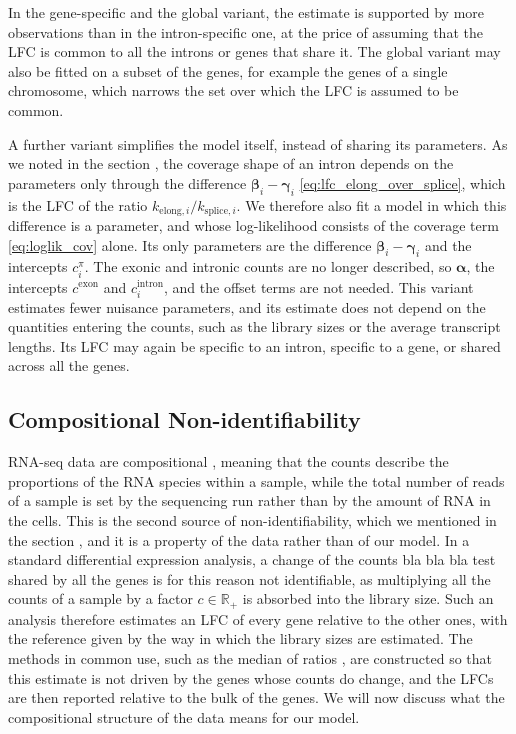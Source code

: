 \documentclass[11pt]{article}
\begin{document}
	In the gene-specific and the global variant, the estimate is supported by more observations than in the intron-specific one, at the price of assuming that the LFC is common to all the introns or genes that share it. The global variant may also be fitted on a subset of the genes, for example the genes of a single chromosome, which narrows the set over which the LFC is assumed to be common.

	A further variant simplifies the model itself, instead of sharing its parameters. As we noted in the section , the coverage shape of an intron depends on the parameters only through the difference $\boldsymbol{\beta}_i - \boldsymbol{\gamma}_i$ \eqref{eq:lfc_elong_over_splice}, which is the LFC of the ratio $k_{\mathrm{elong},i} / k_{\mathrm{splice},i}$. We therefore also fit a model in which this difference is a parameter, and whose log-likelihood consists of the coverage term \eqref{eq:loglik_cov} alone. Its only parameters are the difference $\boldsymbol{\beta}_i - \boldsymbol{\gamma}_i$ and the intercepts $c^{\pi}_{i}$. The exonic and intronic counts are no longer described, so $\boldsymbol{\alpha}$, the intercepts $c^{\mathrm{exon}}$ and $c^{\mathrm{intron}}_{i}$, and the offset terms are not needed. This variant estimates fewer nuisance parameters, and its estimate does not depend on the quantities entering the counts, such as the library sizes or the average transcript lengths. Its LFC may again be specific to an intron, specific to a gene, or shared across all the genes.
	
	\subsection{Compositional Non-identifiability} \label{subsec:compositional_nonidef}

	RNA-seq data are compositional \citep{quinnUnderstandingSequencingData2018}, meaning that the counts describe the proportions of the RNA species within a sample, while the total number of reads of a sample is set by the sequencing run rather than by the amount of RNA in the cells. This is the second source of non-identifiability, which we mentioned in the section , and it is a property of the data rather than of our model. In a standard differential expression analysis, a change of the counts bla bla bla test shared by all the genes is for this reason not identifiable, as multiplying all the counts of a sample by a factor $c \in \mathbb{R}_+$ is absorbed into the library size. Such an analysis therefore estimates an LFC of every gene relative to the other ones, with the reference given by the way in which the library sizes are estimated. The methods in common use, such as the median of ratios \citep{andersDifferentialExpressionAnalysis2010}, are constructed so that this estimate is not driven by the genes whose counts do change, and the LFCs are then reported relative to the bulk of the genes. We will now discuss what the compositional structure of the data means for our model.
\end{document}
